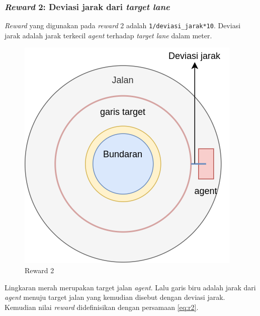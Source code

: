 \subsubsection{\textit{Reward} 2: Deviasi jarak dari \textit{target lane}}
\textit{Reward} yang digunakan pada \textit{reward} 2 adalah \verb=1/deviasi_jarak*10=. Deviasi jarak adalah jarak terkecil \textit{agent} terhadap \textit{target lane} dalam meter.

\begin{figure}[H] 
	\centering
	\includegraphics[width=.85\linewidth]{images/reward_deviasi_jarak}
	\caption{Reward 2}
	\label{fig:reward_deviasi_jarak}
\end{figure}

Lingkaran merah merupakan target jalan \textit{agent}. Lalu garis biru adalah jarak dari \textit{agent} menuju target jalan yang kemudian disebut dengan deviasi jarak. Kemudian nilai \textit{reward }didefinisikan dengan persamaan \ref{eq:r2}.

